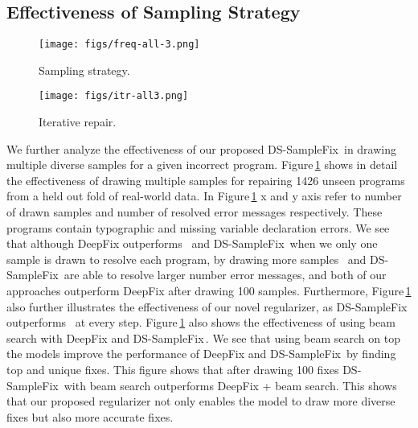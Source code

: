 \documentclass[letterpaper]{article} \usepackage{aaai20}  \usepackage{times}  \usepackage{helvet} \usepackage{courier}  \usepackage[hyphens]{url}  \usepackage{graphicx}
\newcommand{\dssmaplefix}{DS-SampleFix}
\newcommand{\figref}{Figure}
\begin{document}
\subsection{Effectiveness of Sampling Strategy}
\begin{figure*}[h] 
	\centering
	\begin{subfigure}[b]{0.49\textwidth}
	    \centering
		\texttt{[image: figs/freq-all-3.png]}
		\caption{Sampling strategy.}
		\label{fig:freq}
	\end{subfigure} \hfill
	\begin{subfigure}[b]{0.49\textwidth}
	    \centering
		\texttt{[image: figs/itr-all3.png]} 
		\caption{Iterative repair.}
		\label{fig:iterations}
	\end{subfigure} 
	\caption{(a) Number of resolved error messages with drawing 1, 10 and 100 samples for \samplefix \,, \dssmaplefix \,, \dssmaplefix\,+ beam search, and DeepFix + beam search in comparison to number of resolved error messages by DeepFix. (b) Number of error messages after each iterations for DeepFix, DeepFix + beam search,  \samplefix, \dssmaplefix, and \dssmaplefix\,+ beam search.}
	\label{fig:disc}
	\vspace{-0.3cm}
\end{figure*}

We further analyze the effectiveness of our proposed \dssmaplefix\, in drawing multiple diverse samples for a given incorrect program. \figref \,\ref{fig:freq} shows in detail the effectiveness of drawing multiple samples for repairing 1426 unseen programs from a held out fold of real-world data. In \figref \,\ref{fig:freq} x and y axis refer to number of drawn samples and number of resolved error messages respectively. These programs contain typographic and missing variable declaration errors. We see that although DeepFix outperforms \samplefix \, and \dssmaplefix \, when we only one sample is drawn to resolve each program, by drawing more samples \samplefix \, and \dssmaplefix \, are able to resolve larger number error messages, and both of our approaches outperform DeepFix after drawing 100 samples. Furthermore, \figref \,\ref{fig:freq} also further illustrates the effectiveness of our novel regularizer, as \dssmaplefix \, outperforms \samplefix \, at every step. \figref \,\ref{fig:freq} also shows the effectiveness of using beam search with DeepFix and \dssmaplefix \,. We see that using beam search on top the models improve the performance of DeepFix and \dssmaplefix \, by finding top and unique fixes. This figure shows that after drawing 100 fixes  \dssmaplefix \, with beam search outperforms DeepFix + beam search. This shows that our proposed regularizer not only enables the model to draw more diverse fixes but also more accurate fixes. 
\end{document}
